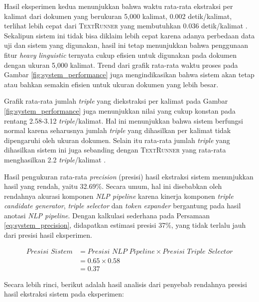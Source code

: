 Hasil eksperimen kedua menunjukkan bahwa waktu rata-rata ekstraksi per kalimat dari dokumen yang berukuran 5,000 kalimat, 0.002 detik/kalimat, terlihat lebih cepat dari \textsc{TextRunner} yang membutuhkan 0.036 detik/kalimat \citep{banko2007open}. Sekalipun sistem ini tidak bisa diklaim lebih cepat karena adanya perbedaan data uji dan sistem yang digunakan, hasil ini tetap menunjukkan bahwa penggunaan fitur \textit{heavy linguistic} ternyata cukup efisien untuk digunakan pada dokumen dengan ukuran 5,000 kalimat. Trend dari grafik rata-rata waktu proses pada Gambar \ref{fig:system_performance} juga mengindikasikan bahwa sistem akan tetap atau bahkan semakin efisien untuk ukuran dokumen yang lebih besar. 

Grafik rata-rata jumlah \textit{triple} yang diekstraksi per kalimat pada Gambar \ref{fig:system_performance} juga menunjukkan nilai yang cukup konstan pada rentang 2.58-3.12 \textit{triple}/kalimat. Hal ini menunjukkan bahwa sistem berfungsi normal karena seharusnya jumlah \textit{triple} yang dihasilkan per kalimat tidak dipengaruhi oleh ukuran dokumen. Selain itu rata-rata jumlah \textit{triple} yang dihasilkan sistem ini juga sebanding dengan \textsc{TextRunner} yang rata-rata menghasilkan 2.2 \textit{triple}/kalimat \citep{banko2007open}.

Hasil pengukuran rata-rata \textit{precision} (presisi) hasil ekstraksi sistem menunjukkan hasil yang rendah, yaitu 32.69\%. Secara umum, hal ini disebabkan oleh rendahnya akurasi komponen \textit{NLP pipeline} karena kinerja komponen \textit{triple candidate generator}, \textit{triple selector} dan \textit{token expander} bergantung pada hasil anotasi \textit{NLP pipeline}. Dengan kalkulasi sederhana pada Persamaan \ref{eq:system_precision}, didapatkan estimasi presisi 37\%, yang tidak terlalu jauh dari presisi hasil eksperimen.

\noindent \begin{align} \label{eq:system_precision}
	\textit{Presisi Sistem} &= \textit{Presisi NLP Pipeline} \times \textit{Presisi Triple Selector} \\ \nonumber
	&= 0.65 \times 0.58 \\ \nonumber
	&= 0.37
\end{align}

Secara lebih rinci, berikut adalah hasil analisis dari penyebab rendahnya presisi hasil ekstraksi sistem pada eksperimen:

